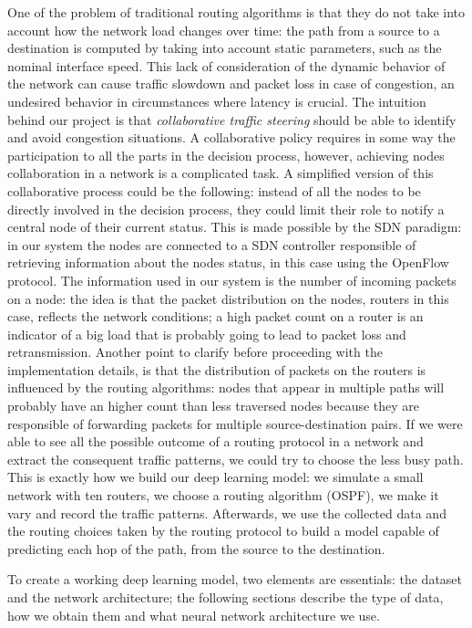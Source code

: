 One of the problem of traditional routing algorithms is that they do not take into account how the network load changes over time: the path from a source to a destination is computed by taking into account static parameters, such as the nominal interface speed. This lack of consideration of the dynamic behavior of the network can cause traffic slowdown and packet loss in case of congestion, an undesired behavior in circumstances where latency is crucial. The intuition behind our project is that \textit{collaborative traffic steering} should be able to identify and avoid congestion situations. A collaborative policy requires in some way the participation to all the parts in the decision process, however, achieving nodes collaboration in a network is a complicated task. A simplified version of this collaborative process could be the following: instead of all the nodes to be directly involved in the decision process, they could limit their role to notify a central node of their current status. This is made possible by the SDN paradigm: in our system the nodes are connected to a SDN controller responsible of retrieving information about the nodes status, in this case using the OpenFlow protocol. %
The information used in our system is the number of incoming packets on a node: the idea is that the packet distribution on the nodes, routers in this case, reflects the network conditions; a high packet count on a router is an indicator of a big load that is probably going to lead to packet loss and retransmission. Another point to clarify before proceeding with the implementation details, is that the distribution of packets on the routers is influenced by the routing algorithms: nodes that appear in multiple paths will probably have an higher count than less traversed nodes because they are responsible of forwarding packets for multiple source-destination pairs. If we were able to see all the possible outcome of a routing protocol in a network and extract the consequent traffic patterns, we could try to choose the less busy path. This is exactly how we build our deep learning model: we simulate a small network with ten routers, we choose a routing algorithm (OSPF), we make it vary and record the traffic patterns. Afterwards, we use the collected data and the routing choices taken by the routing protocol to build a model capable of predicting each hop of the path, from the source to the destination.

To create a working deep learning model, two elements are essentials: the dataset and the network architecture; the following sections describe the type of data, how we obtain them and what neural network architecture we use. 

